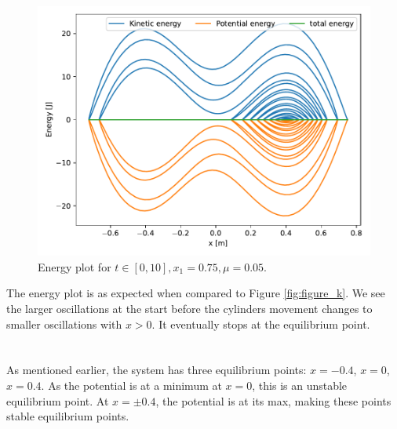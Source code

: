 \documentclass[a4paper,10pt,english]{article}
\begin{document}
\newpage
\section{}
\begin{figure}[h!]
    \centering
    \includegraphics[scale=0.7]{figure_l.pdf}
    \caption{Energy plot for $t\in[0, 10], x_1=0.75, \mu=0.05$.}
    \label{fig:figure_l}
\end{figure}
The energy plot is as expected when compared to Figure \ref{fig:figure_k}. We see the larger oscillations at the start before the cylinders movement changes to smaller oscillations with $x>0$. It eventually stops at the equilibrium point.

\section{}
As mentioned earlier, the system has three equilibrium points: $x=-0.4$, $x=0$, $x=0.4$. As the potential is at a minimum at $x=0$, this is an unstable equilibrium point. At $x=\pm 0.4$, the potential is at its max, making these points stable equilibrium points. 
\end{document}
